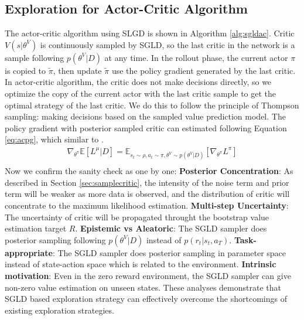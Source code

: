 \subsection{Exploration for Actor-Critic Algorithm}
The actor-critic algorithm using SLGD is shown in Algorithm \ref{alg:sgldac}. Critic $V(s|\theta^V)$ is continuously sampled by SGLD, so the last critic in the network is a sample following $p(\theta^V|D)$ at any time. In the rollout phase, the current actor $\pi$ is copied to $\tilde\pi$, then update $\tilde\pi$ use the policy gradient generated by the last critic. In actor-critic algorithm, the critic does not make decisions directly, so we optimize the copy of the current actor with the last critic sample to get the optimal strategy of the last critic. We do this to follow the principle of Thompson sampling: making decisions based on the sampled value prediction model. The policy gradient with posterior sampled critic can estimated following Equation \ref{eq:acpg}, which similar to \cite{dropoutInference}.
\begin{equation}
   \label{eq:acpg} 
   \begin{aligned}
   \nabla_{\theta^\pi}\mathbb{E}[L^\mu|D] = \mathbb{E}_{s_t\sim\rho,a_t\sim\pi,\theta^V\sim p(\theta^V|D)}[\nabla_{\theta^\pi}L^\pi]\\
   \end{aligned}
\end{equation}
Now we confirm the sanity check as \cite{osband2018randomized} one by one: \textbf{Posterior Concentration}: As described in Section \ref{sec:samplecritic}, the intensity of the noise term and prior term will be weaker as more data is observed, and the distribution of critic will concentrate to the maximum likelihood estimation. \textbf{Multi-step Uncertainty}: The uncertainty of critic will be propagated throught the bootstrap value estimation target $R$. \textbf{Epistemic vs Aleatoric}: The SGLD sampler does posterior sampling following $p(\theta^V|D)$ instead of $p(r_t|s_t,a_T)$. \textbf{Task-appropriate}: The SGLD sampler does posterior sampling in parameter space instead of state-action space which is related to the environment. \textbf{Intrinsic motivation}: Even in the zero reward environment, the SGLD sampler can give non-zero value estimation on unseen states. These analyses demonstrate that SGLD based exploration strategy can effectively overcome the shortcomings of existing exploration strategies.